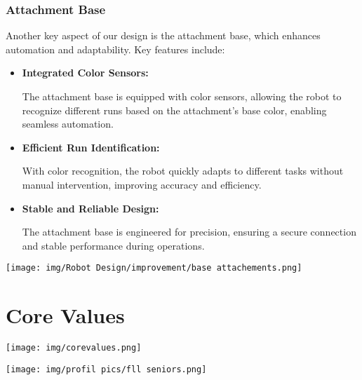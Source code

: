 \subsection{Attachment Base}
\begin{minipage}{0.6\textwidth}
    Another key aspect of our design is the attachment base, which enhances automation and adaptability. Key features include:

    \begin{itemize}
        \item \textbf{Integrated Color Sensors:} 
        
        The attachment base is equipped with color sensors, allowing the robot to recognize different runs based on the attachment’s base color, enabling seamless automation.
        
        \item \textbf{Efficient Run Identification:} 
        
        With color recognition, the robot quickly adapts to different tasks without manual intervention, improving accuracy and efficiency.
        
        \item \textbf{Stable and Reliable Design:} 
        
        The attachment base is engineered for precision, ensuring a secure connection and stable performance during operations.
    \end{itemize}
\end{minipage}%
\hfill
\begin{minipage}{0.35\textwidth}
    \centering
    \texttt{[image: img/Robot Design/improvement/base attachements.png]}
\end{minipage}





\newpage

\chapter{Core Values}
\vfill 
\begin{center}
    \texttt{[image: img/corevalues.png]}
    \\ 
    \vspace{1cm} 

    \texttt{[image: img/profil pics/fll seniors.png]} 
    \\ 
\end{center}
\vfill 

